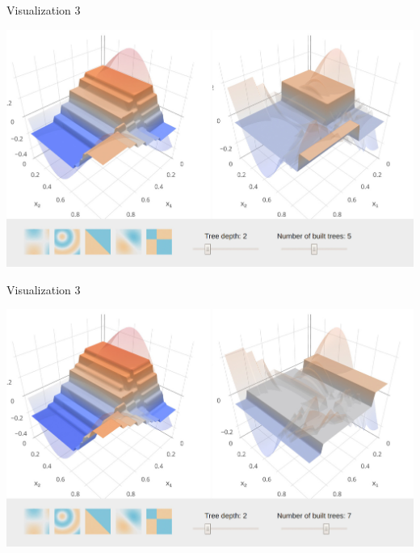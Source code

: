 

\begin{vbframe}{Visualization 3}

\begin{center}
\includegraphics[width=\textwidth]{figure_man/gbm_anim/gbm5.jpg}
\href{http://arogozhnikov.github.io/2016/06/24/gradient_boosting_explained.html}{}
\end{center}
\addtocounter{framenumber}{-1}

\end{vbframe}


\begin{vbframe}{Visualization 3}

\begin{center}
\includegraphics[width=\textwidth]{figure_man/gbm_anim/gbm7.jpg}
\href{http://arogozhnikov.github.io/2016/06/24/gradient_boosting_explained.html}{}
\end{center}
\addtocounter{framenumber}{-1}

\end{vbframe}

